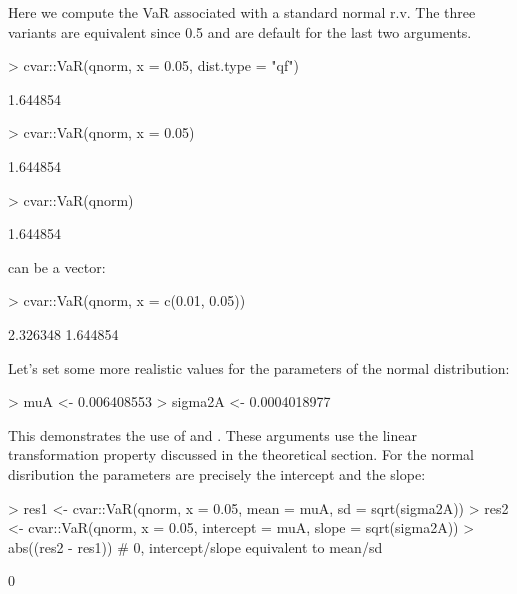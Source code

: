 \documentclass[nojss,article]{jss}
\begin{document}
Here we compute the VaR associated with a standard normal r.v.
The three variants are equivalent since 0.5 and  are default for the last two arguments.
\begin{Schunk}
\begin{Sinput}
> cvar::VaR(qnorm, x = 0.05, dist.type = "qf")
\end{Sinput}
\begin{Soutput}
[1] 1.644854
\end{Soutput}
\begin{Sinput}
> cvar::VaR(qnorm, x = 0.05)
\end{Sinput}
\begin{Soutput}
[1] 1.644854
\end{Soutput}
\begin{Sinput}
> cvar::VaR(qnorm)
\end{Sinput}
\begin{Soutput}
[1] 1.644854
\end{Soutput}
\end{Schunk}

 can be a vector:
\begin{Schunk}
\begin{Sinput}
> cvar::VaR(qnorm, x = c(0.01, 0.05))
\end{Sinput}
\begin{Soutput}
[1] 2.326348 1.644854
\end{Soutput}
\end{Schunk}

Let's set some more realistic values for the parameters of the normal distribution:
\begin{Schunk}
\begin{Sinput}
> muA <- 0.006408553
> sigma2A <- 0.0004018977
\end{Sinput}
\end{Schunk}

This demonstrates the use of  and . These arguments use the
linear transformation property discussed in the theoretical section. For the normal
disribution the parameters are precisely the intercept and the slope:
\begin{Schunk}
\begin{Sinput}
> res1 <- cvar::VaR(qnorm, x = 0.05, mean = muA, sd = sqrt(sigma2A))
> res2 <- cvar::VaR(qnorm, x = 0.05, intercept = muA, slope = sqrt(sigma2A))
> abs((res2 - res1)) # 0, intercept/slope equivalent to mean/sd
\end{Sinput}
\begin{Soutput}
[1] 0
\end{Soutput}
\end{Schunk}
\end{document}
